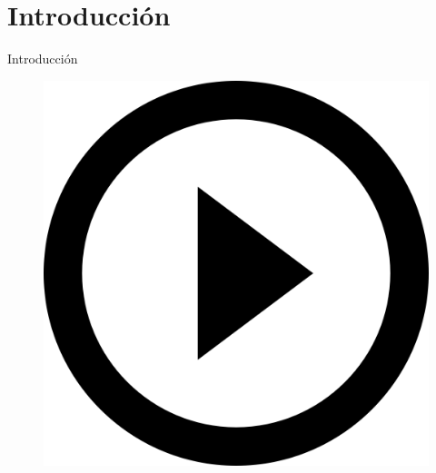 \documentclass{beamer}
\begin{document}
\section{Introducción} %

\begin{frame}
\Huge{\centerline{Introducción}}
\begin{figure}
	\begin{center}
		\includegraphics[scale=0.2]{images/2icons/start.png}
	\end{center}
\end{figure}
\end{frame}
\end{document}
